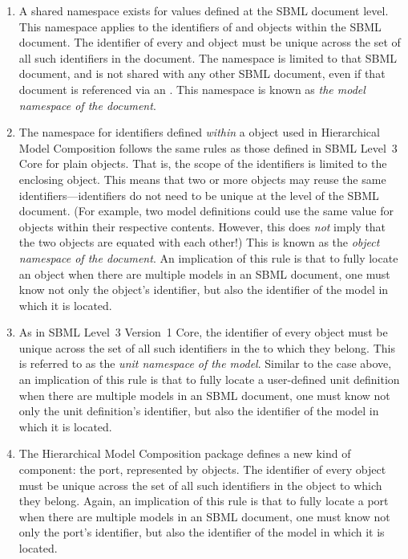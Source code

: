 \begin{enumerate}

\item A shared namespace exists for  values defined at the
  SBML document level.  This namespace applies to the identifiers of
  \Model and \ExternalModelDefinition objects within the SBML document.
  The identifier of every \Model and \ExternalModelDefinition object
  must be unique across the set of all such identifiers in the document.
  The namespace is limited to that SBML document, and is not shared with
  any other SBML document, even if that document is referenced via an
  \ExternalModelDefinition.  This namespace is known as \emph{the model
    namespace of the document}.

\item The namespace for  identifiers defined \emph{within}
  a \Model object used in Hierarchical Model Composition follows the
  same rules as those defined in SBML Level~3 Core for plain \Model
  objects.  That is, the scope of the identifiers is limited to the
  enclosing \Model object.  This means that two or more \Model objects
  may reuse the same identifiers---identifiers do not need to be unique
  at the level of the SBML document.  (For example, two model
  definitions could use the same  value for
  \Parameter objects within their respective contents.  However, this
  does \emph{not} imply that the two objects are equated with each
  other!)  This is known as the \emph{object namespace of the document}.
  An implication of this rule is that to fully locate an object when
  there are multiple models in an SBML document, one must know not only
  the object's identifier, but also the identifier of the model in which
  it is located.

\item As in SBML Level~3 Version~1 Core, the identifier of every
  \UnitDefinition object must be unique across the set of all such
  identifiers in the \Model to which they belong.  This is referred to
  as the \emph{unit namespace of the model}.  Similar to the case above,
  an implication of this rule is that to fully locate a user-defined
  unit definition when there are multiple models in an SBML document,
  one must know not only the unit definition's identifier, but also the
  identifier of the model in which it is located.

\item The Hierarchical Model Composition package defines a new kind of
  component: the port, represented by \Port objects.  The identifier of
  every \Port object must be unique across the set of all such
  identifiers in the \Model object to which they belong.  Again, an
  implication of this rule is that to fully locate a port when there are
  multiple models in an SBML document, one must know not only the port's
  identifier, but also the identifier of the model in which it is
  located.


\end{enumerate}
